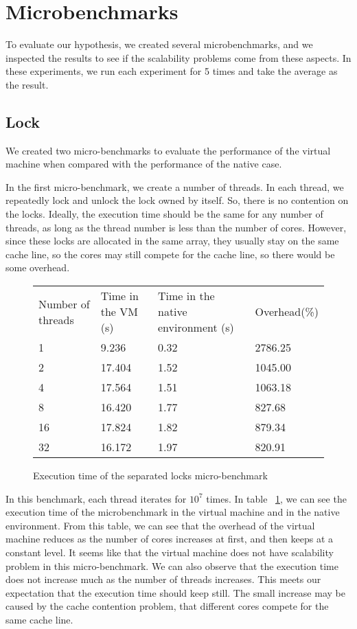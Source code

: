 \section{Microbenchmarks}
To evaluate our hypothesis, we created several microbenchmarks, and we inspected
the results to see if the scalability problems come from these aspects.
In these experiments, we run each experiment for 5 times and take the average
as the result.

\subsection{Lock}
We created two micro-benchmarks to evaluate the performance of the virtual
machine when compared with the performance of the native case.

In the first micro-benchmark, we create a number of threads. In each thread, 
we repeatedly lock and unlock the lock owned by itself. So, there is no 
contention on the locks. Ideally, the execution time should be the same for any 
number of threads, as long as the thread number is less than the number of 
cores.  However, since these locks are allocated in the same array, they usually
stay on the same cache line, so the cores may still compete for the cache line,
so there would be some overhead.

\begin{figure}[here]
\begin{tabular}{  l | l | l | l  }
	Number of threads & Time in the VM (s) & Time in the native environment (s) & Overhead(\%) \\
	1 & 9.236 & 0.32 & 2786.25 \\ 
	2 & 17.404 & 1.52 & 1045.00 \\
	4 & 17.564 & 1.51 & 1063.18 \\
	8 & 16.420 & 1.77 & 827.68 \\
	16 & 17.824 & 1.82 & 879.34 \\
	32 & 16.172 & 1.97 & 820.91 \\
\end{tabular}
\caption{Execution time of the separated locks micro-benchmark}
\label{fig:sep_mutex}
\end{figure}

In this benchmark, each thread iterates for $10^7$ times.
In table ~\ref{fig:sep_mutex}, we can see the execution time of the
microbenchmark in the virtual machine and in the native environment.
From this table, we can see that the overhead of the virtual machine reduces as
the number of cores increases at first, and then keeps at a constant level.
It seems like that the virtual machine does not have scalability problem in
this micro-benchmark.
We can also observe that the execution time does not increase much as the
number of threads increases. This meets our expectation that the execution
time should keep still. The small increase may be caused by the cache
contention problem, that different cores compete for the same cache line.


